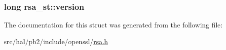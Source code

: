 \subsubsection[{\texorpdfstring{version}{version}}]{\setlength{\rightskip}{0pt plus 5cm}long rsa\+\_\+st\+::version}\hypertarget{structrsa__st_a431bc852602846bf6893a7df86fc2cb3}{}\label{structrsa__st_a431bc852602846bf6893a7df86fc2cb3}


The documentation for this struct was generated from the following file\+:\begin{DoxyCompactItemize}
\item 
src/hal/pb2/include/openssl/\hyperlink{rsa_8h}{rsa.\+h}\end{DoxyCompactItemize}
